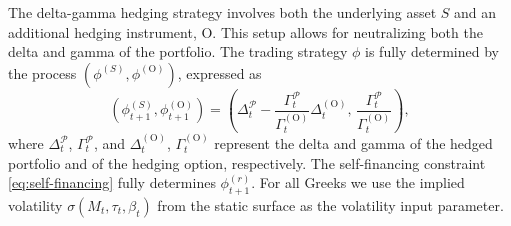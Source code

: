 \documentclass[12pt]{article}
\begin{document}
The delta-gamma hedging strategy involves both the underlying asset $S$ and an additional hedging instrument, $\text{O}$. This setup allows for neutralizing both the delta and gamma of the portfolio. The trading strategy $\phi$ is fully determined by the process $(\phi^{(S)}, \phi^{(\text{O})})$, expressed as
\begin{equation*}
    (\phi^{(S)}_{t+1}, \phi^{(\text{O})}_{t+1}) 
    = \left(\Delta^{\mathcal{P}}_{t} - \frac{\Gamma^{\mathcal{P}}_{t}}{\Gamma_{t}^{(\text{O})}} \Delta^{(\text{O})}_{t}, \, \frac{\Gamma^{\mathcal{P}}_{t}}{\Gamma_{t}^{(\text{O})}}\right),
\end{equation*}
where $\Delta^{\mathcal{P}}_{t}$, $\Gamma^{\mathcal{P}}_{t}$, and  $\Delta^{(\text{O})}_{t}$, $\Gamma_{t}^{(\text{O})}$ represent the delta and gamma of the hedged portfolio and of the hedging option, respectively. The self-financing constraint \eqref{eq:self-financing} fully determines $\phi^{(r)}_{t+1}$.
For all Greeks we use the implied volatility $\sigma (M_{t},\tau_{t},\beta_{t})$ from the static surface as the volatility input parameter.
\end{document}
